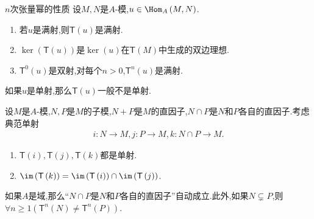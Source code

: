\begin{proposition}{$n$次张量幂的性质}{}
	设$M,N$是$A$-模,$u\in\Hom_{A}\left(M,N\right)$.
	\begin{enumerate}
		\item 若$u$是满射,则$\mathsf{T}\left(u\right)$是满射.
		\item $\ker\left(\mathsf{T}\left(u\right)\right)$是$\ker\left(u\right)$在$\mathsf{T}\left(M\right)$中生成的双边理想.
		\item $\mathsf{T}^{0}\left(u\right)$是双射,对每个$n>0$,$\mathsf{T}^{n}\left(u\right)$是满射.
	\end{enumerate}
\end{proposition}

\begin{remark}{}{}
	如果$u$是单射,那么$\mathsf{T}\left(u\right)$一般不是单射.
\end{remark}

\begin{proposition}{}{}
	设$M$是$A$-模,$N,P$是$M$的子模,$N+P$是$M$的直因子,$N\cap P$是$N$和$P$各自的直因子.考虑典范单射
	\begin{align*}
		i:N\to M,j:P\to M,k:N\cap P\to M.
	\end{align*}
	\begin{enumerate}
		\item $\mathsf{T}\left(i\right),\mathsf{T}\left(j\right),\mathsf{T}\left(k\right)$都是单射.
		\item $\im\left(\mathsf{T}\left(k\right)\right)=\im\left(\mathsf{T}\left(i\right)\right)\cap\im\left(\mathsf{T}\left(j\right)\right)$.
	\end{enumerate}
\end{proposition}

\begin{remark}{}{}
	如果$A$是域,那么``$N\cap P$是$N$和$P$各自的直因子''自动成立.此外,如果$N\subsetneq P$,则$\forall n\geq 1\left(\mathsf{T}^{n}\left(N\right)\neq\mathsf{T}^{n}\left(P\right)\right)$.
\end{remark}
























